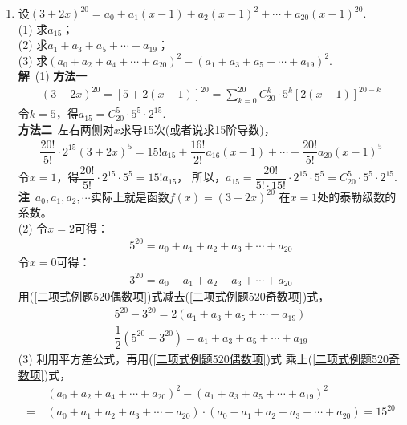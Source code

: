 \begin{enumerate}[label={【\textbf{例\thechapter.\arabic*}】},
 leftmargin=\inteval{\myenumleftmargin}pt,
 itemsep=\inteval{\myenumitempsep}pt,
 itemindent=\inteval{\myenumitemindent}pt]
\item 设$ (3+2x)^{20}=a_0+a_1(x-1)+a_2(x-1)^2+\cdots+a_{20}(x-1)^{20} $. \\
(1) 求$ a_{15} $；\\
(2) 求$ a_{1}+a_{3}+a_{5}+\cdots+a_{19} $；\\
(3) 求$ (a_{0}+a_{2}+a_{4}+\cdots+a_{20})^2-
(a_{1}+a_{3}+a_{5}+\cdots+a_{19})^2 $. \\
\textbf{解}\ (1) \textbf{方法一}
\begin{align*}
    (3+2x)^{20}=[5+2(x-1)]^{20}=
    \sum_{k=0}^{20}C_{20}^{k}\cdot 5^k[2(x-1)]^{20-k}
\end{align*}
令$ k=5 $，得$ a_{15}=C_{20}^5 \cdot 5^5\cdot 2^{15} $. \\
\textbf{方法二}\ 左右两侧对$ x $求导15次(或者说求15阶导数)，
\begin{align*}
    \dfrac{20!}{5!} \cdot 2^{15}(3+2x)^5= 15!a_{15}+
    \dfrac{16!}{2!}a_{16}(x-1)+\cdots+\dfrac{20!}{5!}a_{20}(x-1)^5
\end{align*}
令$ x=1 $，得$ \dfrac{20!}{5!} \cdot 2^{15}\cdot 5^5=15!a_{15} $，
所以，$ a_{15}=\dfrac{20!}{5!\cdot 15!}\cdot 2^{15}\cdot 5^5=
C_{20}^5 \cdot 5^5\cdot 2^{15} $. \\
\textbf{注}\ $ a_0,a_1,a_2,\cdots $实际上就是函数$ f(x)=(3+2x)^{20} $
在$ x=1 $处的泰勒级数的系数。\\
(2) 令$ x=2 $可得：
\begin{gather} \label{二项式例题520偶数项}
    5^{20}=a_0+a_1+a_2+a_3+\cdots+a_{20}
\end{gather}
令$ x=0 $可得：
\begin{gather} \label{二项式例题520奇数项}
    3^{20}=a_0-a_1+a_2-a_3+\cdots+a_{20}
\end{gather}
用(\ref{二项式例题520偶数项})式减去(\ref{二项式例题520奇数项})式，
\begin{gather*}
    5^{20}-3^{20}=2(a_{1}+a_{3}+a_{5}+\cdots+a_{19}) \\
    \dfrac{1}{2}(5^{20}-3^{20})=a_{1}+a_{3}+a_{5}+\cdots+a_{19}
\end{gather*}
(3) 利用平方差公式，再用(\ref{二项式例题520偶数项})式
乘上(\ref{二项式例题520奇数项})式，
\begin{align*}
    &\ (a_{0}+a_{2}+a_{4}+\cdots+a_{20})^2-
    (a_{1}+a_{3}+a_{5}+\cdots+a_{19})^2 \\
    =&\ (a_0+a_1+a_2+a_3+\cdots+a_{20})\cdot 
    (a_0-a_1+a_2-a_3+\cdots+a_{20}) =15^{20}
\end{align*}


\end{enumerate}
